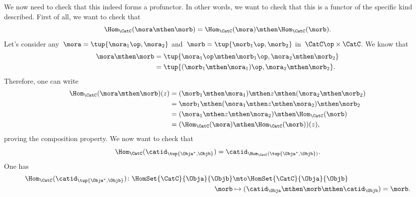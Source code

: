 
We now need to check that this indeed forms a profunctor.
In other words, we want to check that this is a functor of the specific kind described.
First of all, we want to check that
%
\begin{equation}
    \label{eq:hom5}
    \Hom_\CatC(\mora \mthen \morb)=\Hom_\CatC(\mora)\mthen \Hom_\CatC(\morb).
\end{equation}
%
Let's consider any~$\mora=\tup{\mora_1\op, \mora_2}$ and~$\morb=\tup{\morb_1\op,\morb_2}$ in~$\CatC\op \times \CatC$.
We know that
\begin{equation}
    \label{eq:hom6}
    \begin{aligned}
        \mora\mthen \morb & =\tup{\mora_1\op \mthen \morb_1\op, \mora_2\mthen \morb_2} \\
                          & =\tup{(\morb_1\mthen \mora_1)\op, \mora_2\mthen \morb_2}.
    \end{aligned}
\end{equation}
Therefore, one can write
\begin{equation}
    \label{eq:hom7}
    \begin{aligned}
        \Hom_\CatC(\mora \mthen \morb)(z) & =(\morb_1\mthen \mora_1)\mthen z \mthen (\mora_2\mthen \morb_2) \\
                                          & =\morb_1\mthen (\mora_1\mthen z \mthen \mora_2) \mthen \morb_2  \\
                                          & =(\mora_1\mthen z \mthen \mora_2)\mthen \Hom_\CatC(\morb)       \\
                                          & =(\Hom_\CatC(\mora)\mthen \Hom_\CatC(\morb))(z),
    \end{aligned}
\end{equation}
proving the composition property.
We now want to check that
\begin{equation}
    \label{eq:hom_identity}
    \Hom_\CatC(\catid_{\tup{\Obja^*,\Objb}})=\catid_{\Hom_\CatC(\tup{\Obja^*,\Objb})}.
\end{equation}
%
One has
%
\begin{equation*}
    \begin{aligned}
        \Hom_\CatC(\catid_{\tup{\Obja^*,\Objb}})\colon \HomSet{\CatC}{\Obja}{\Objb} & \mto \HomSet{\CatC}{\Obja}{\Objb}                              \\
        \morb                                                                       & \mapsto (\catid_\Obja \mthen \morb \mthen \catid_\Objb)=\morb.
    \end{aligned}
\end{equation*}
